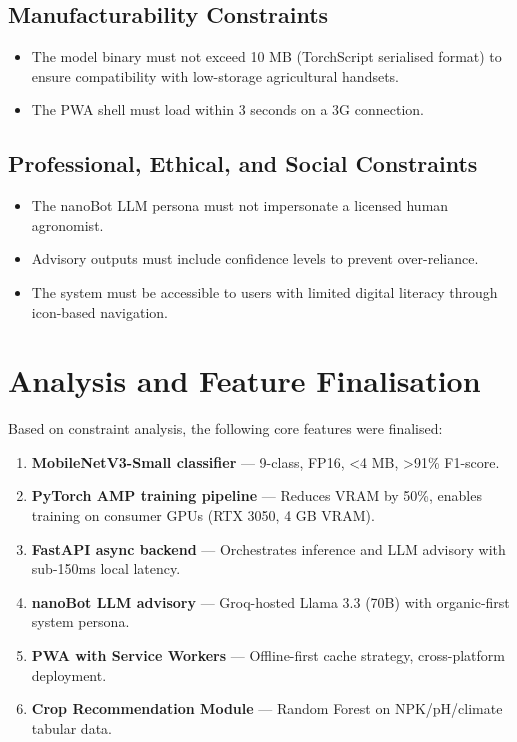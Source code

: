 \documentclass[12pt,oneside]{report}
\begin{document}
\subsection{Manufacturability Constraints}
\begin{itemize}
    \item The model binary must not exceed 10 MB (TorchScript serialised format) to ensure compatibility with low-storage agricultural handsets.
    \item The PWA shell must load within 3 seconds on a 3G connection.
\end{itemize}

\subsection{Professional, Ethical, and Social Constraints}
\begin{itemize}
    \item The nanoBot LLM persona must not impersonate a licensed human agronomist.
    \item Advisory outputs must include confidence levels to prevent over-reliance.
    \item The system must be accessible to users with limited digital literacy through icon-based navigation.
\end{itemize}

\section{Analysis and Feature Finalisation}
Based on constraint analysis, the following core features were finalised:

\begin{enumerate}
    \item \textbf{MobileNetV3-Small classifier} — 9-class, FP16, <4 MB, >91\% F1-score.
    \item \textbf{PyTorch AMP training pipeline} — Reduces VRAM by 50\%, enables training on consumer GPUs (RTX 3050, 4 GB VRAM).
    \item \textbf{FastAPI async backend} — Orchestrates inference and LLM advisory with sub-150ms local latency.
    \item \textbf{nanoBot LLM advisory} — Groq-hosted Llama 3.3 (70B) with organic-first system persona.
    \item \textbf{PWA with Service Workers} — Offline-first cache strategy, cross-platform deployment.
    \item \textbf{Crop Recommendation Module} — Random Forest on NPK/pH/climate tabular data.
\end{enumerate}
\end{document}
